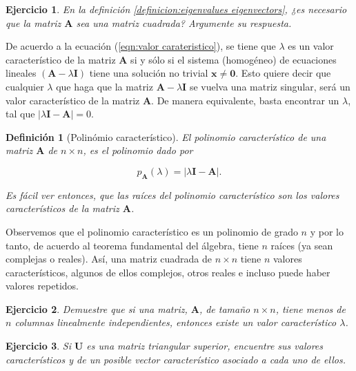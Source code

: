 \documentclass[11pt]{report}
\theoremstyle{break}
\newtheorem{definicion}{Definición}[chapter]
\newtheorem{ejercicio}{Ejercicio}[chapter]
\theoremstyle{break}
\newcommand{\matdim}[2]{$#1 \times #2$}
\begin{document}
\begin{ejercicio}
En la definición \ref{definicion:eigenvalues eigenvectors}, ¿es necesario que la matriz $\bm{A}$ sea una matriz cuadrada? Argumente su respuesta.
\end{ejercicio}

De acuerdo a la ecuación (\ref{eqn:valor carateristico}), se tiene que $\lambda$ es un valor característico de la matriz $\bm{A}$ si y sólo si el sistema (homogéneo) de ecuaciones lineales $\left( \bm{A} - \lambda \bm{I} \right)$ tiene una solución no trivial $\bm{x} \neq \bm{0}$. Esto quiere decir que cualquier $\lambda$ que haga que la matriz  $\bm{A} - \lambda \bm{I}$ se vuelva una matriz singular, será un valor característico de la matriz $\bm{A}$. De manera equivalente, basta  encontrar un $\lambda$, tal que $|\lambda \bm{I} - \bm{A}| = 0.$

\begin{definicion}[Polinómio característico]
\label{definicion:polinomio caracteristico}
El polinomio característico de una matriz $\bm{A}$ de \matdim{n}{n}, es el polinomio dado por

\begin{equation}
p_{\bm{A}}(\lambda) = \left| \lambda \bm{I} - \bm{A} \right|. \label{eqn:polinomio caracteristico}
\end{equation}

Es fácil ver entonces, que las raíces del polinomio característico son los valores característicos de la matriz $\bm{A}$.
\end{definicion}

Observemos que el polinomio característico es un polinomio de grado $n$ y por lo tanto, de acuerdo al teorema fundamental del álgebra, tiene $n$ raíces (ya sean complejas o reales). Así, una matriz cuadrada de \matdim{n}{n} tiene $n$ valores característicos, algunos de ellos complejos, otros reales e incluso puede haber valores repetidos.

\begin{ejercicio}
Demuestre que si una matriz, $\bm{A}$, de tamaño \matdim{n}{n}, tiene menos de $n$ columnas linealmente independientes, entonces existe un valor característico $\lambda$.
\end{ejercicio}

\begin{ejercicio}
Si $\bm{U}$ es una matriz triangular superior, encuentre sus valores característicos y de un posible vector característico asociado a cada uno de ellos.
\end{ejercicio}
\end{document}
